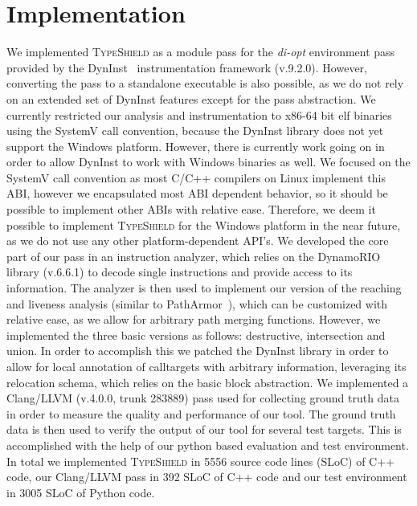\section{Implementation}
\label{chapter:Implementation}

We implemented \textsc{TypeShield} as a module pass for the \textit{di-opt} environment pass provided by the 
DynInst~\cite{bernat:dyninst} instrumentation framework (v.9.2.0). 
However, converting the pass to a standalone executable is also possible, as we do not rely on an extended set of DynInst features
except for the pass abstraction.
We currently restricted our analysis and instrumentation to x86-64 bit elf 
binaries using the SystemV call convention, because the DynInst library does not yet support the
Windows platform. However, there is currently work going on in order to allow DynInst to work with
Windows binaries as well. We focused on the SystemV call convention as most C/C++ compilers
on Linux implement this ABI, however we encapsulated most ABI dependent behavior, so it should 
be possible to implement other ABIs with relative ease. Therefore, we deem it possible to implement
\textsc{TypeShield} for the Windows platform in the near future, as we do not use any other 
platform-dependent API's. 
We developed the core part of our pass in an instruction analyzer, which relies on the DynamoRIO~\cite{dynamorio:drmemory} library 
(v.6.6.1) to decode single instructions and provide access to its information. The analyzer is then
used to implement our version of the reaching and liveness analysis (similar to PathArmor~\cite{veen:typearmor}), which can
be customized with relative ease, as we allow for arbitrary path merging functions. However, we implemented 
the three basic versions as follows: destructive, intersection and union.
In order to accomplish this we patched the DynInst library in order to allow for local annotation of calltargets with arbitrary
information, leveraging its relocation schema, which relies on the basic block abstraction.
We implemented a Clang/LLVM (v.4.0.0, trunk 283889) pass used for 
collecting ground truth data in order to measure the quality and performance of our tool. 
The ground truth data is then used to verify the output of our tool for several test targets. 
This is accomplished with the help of our python based evaluation and test environment.
In total we implemented \textsc{TypeShield} in 5556 source code lines (SLoC) of C++ code, our Clang/LLVM pass in 392 SLoC
of C++ code and our test environment in 3005 SLoC of Python code. 


